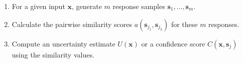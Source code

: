 \begin{block}{\color{mydarkgreen}{Method Overview}}

\begin{enumerate}
    \item For a given input $\mathbf{x}$, generate $m$ response samples $\mathbf{s}_1, \ldots, \mathbf{s}_m$.
    \item Calculate the pairwise similarity scores $a(\mathbf{s}_{j_1}, \mathbf{s}_{j_2})$ for these $m$ responses.
    \item Compute an uncertainty estimate $U(\mathbf{x})$ or a confidence score $C(\mathbf{x},\mathbf{s}_j)$ using the similarity values.
\end{enumerate}
\end{block}